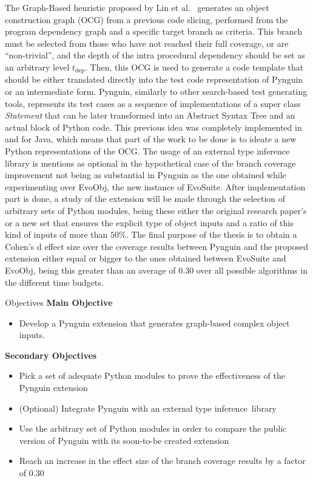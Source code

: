 \documentclass[%
  chapterprefix=false,%
  open=right,%
  twoside=true,%
  paper=a4,%
  logofile={Figures/logo.png},%
  thesistype=master,%
  UKenglish,%
]{se2thesis}
\begin{document}
The Graph-Based heuristic proposed by Lin et al.~\cite{DBLP:conf/sigsoft/0001O00D21} generates an object construction graph (OCG) from a previous code slicing, performed from the program dependency graph and a specific target branch as criteria.
This branch must be selected from those who have not reached their full coverage, or are ``non-trivial'', and the depth of the intra procedural dependency should be set as an arbitrary level $t_{\text{dep}}$.
Then, this OCG is used to generate a code template that should be either translated directly into the test code representation of Pynguin or an intermediate form.
Pynguin, similarly to other search-based test generating tools, represents its test cases as a sequence of implementations of a super class \textit{Statement} that can be later transformed into an Abstract Syntax Tree and an actual block of Python code.
This previous idea was completely implemented in and for Java, which means that part of the work to be done is to ideate a new Python representations of the OCG.\@
The usage of an external type inference library is mentions as optional in the hypothetical case of the branch coverage improvement not being as substantial in Pynguin as the one obtained while experimenting over EvoObj, the new instance of EvoSuite.
After implementation part is done, a study of the extension will be made through the selection of arbitrary sets of Python modules, being these either the original research paper's or a new set that ensures the explicit type of object inputs and a ratio of this kind of inputs of more than $50\%$.
The final purpose of the thesis is to obtain a Cohen's d effect size over the coverage results between Pynguin and the proposed extension either equal or bigger to the ones obtained between EvoSuite and EvoObj, being this greater than an average of $0.30$ over all possible algorithms in the different time budgets.



\begin{summary}{Objectives}
\centering\textbf{Main Objective}
\begin{itemize}
\item  Develop a Pynguin extension that generates graph-based complex object inputs.
\end{itemize}
\centering\textbf{Secondary Objectives}
\begin{itemize}
\item  Pick a set of adequate Python modules to prove the effectiveness of the Pynguin extension
\item (Optional) Integrate Pynguin with an external type inference~library
\item Use the arbitrary set of Python modules in order to compare the public version of Pynguin with its soon-to-be created extension
\item Reach an increase in the effect size of the branch coverage results by a factor of $0.30$
\end{itemize}
\end{summary}
\end{document}
